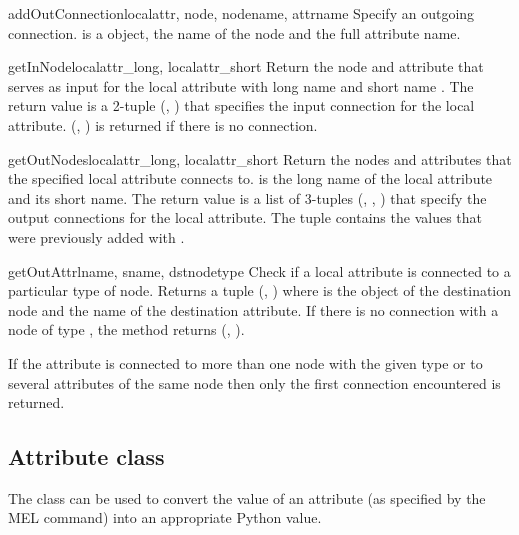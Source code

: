 \begin{methoddesc}{addOutConnection}{localattr, node, nodename, attrname}
Specify an outgoing connection.
 is a  object,  the name of the 
node and  the full attribute name.
\end{methoddesc}

\begin{methoddesc}{getInNode}{localattr_long, localattr_short}
Return the node and attribute that serves as input for the local
attribute with long name  and short name
. The return value is a 2-tuple (,
) that specifies the input connection for the 
local attribute. (, ) is returned if there is 
no connection.
\end{methoddesc}

\begin{methoddesc}{getOutNodes}{localattr_long, localattr_short}
Return the nodes and attributes that the specified local attribute
connects to.  is the long name of the local
attribute and  its short name.
The return value is a list of 3-tuples (, , 
) that specify the output connections for the
local attribute. The tuple contains the values that were previously
added with .
\end{methoddesc}

\begin{methoddesc}{getOutAttr}{lname, sname, dstnodetype}
Check if a local attribute is connected to a particular type of node.
Returns a tuple (, ) where  is the
 object of the destination node and  the name of 
the destination attribute. If there is no connection with a node of
type , the method returns (, ).

If the attribute is connected to more than one node with the given
type or to several attributes of the same node then only the first
connection encountered is returned.
\end{methoddesc}

\subsection{Attribute class}

The  class can be used to convert the value of an
attribute (as specified by the  MEL command) into an
appropriate Python value.

